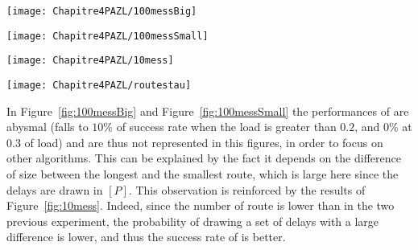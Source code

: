 \begin{minipage}[c]{.49\linewidth}

\begin{center}
\texttt{[image: Chapitre4PAZL/100messBig]}

\label{fig:100messBig}
\end{center} 
\end{minipage}
\begin{minipage}[c]{.45\linewidth}
\begin{center}  
\texttt{[image: Chapitre4PAZL/100messSmall]}
\label{fig:100messSmall}
\end{center}
\end{minipage}



\begin{minipage}[c]{.49\linewidth}

\begin{center}
\texttt{[image: Chapitre4PAZL/10mess]}
\end{center}
\label{fig:10mess}
\end{minipage}
\begin{minipage}[c]{.45\linewidth}
\begin{center}
\texttt{[image: Chapitre4PAZL/routestau]}
\end{center}
\label{fig:shortroutes}
\end{minipage}

\vspace{1cm}

In Figure~\ref{fig:100messBig} and Figure~\ref{fig:100messSmall} the performances of \shortestlongest are abysmal (falls to $10\%$ of success rate when the load is greater than $0.2$, and $0\%$ at $0.3$ of load) and are thus not represented in this figures, in order to focus on other algorithms. This can be explained by the fact it depends on the difference of size between the longest and the smallest route, which is large here since the delays are drawn in $[P]$. This observation is reinforced by the results of Figure~\ref{fig:10mess}. Indeed, since the number of route is lower than in the two previous experiment, the probability of drawing a set of delays with a large difference is lower, and thus the success rate of \shortestlongest is better. 

